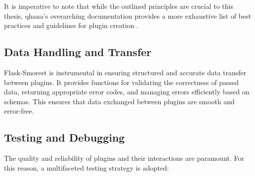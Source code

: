 \documentclass[
  a4paper,  %
  twoside,  %
  bibliography=totoc,
  headsepline,
  cleardoublepage=empty,
  parskip=half,
  draft=false
]{scrbook}
\begin{document}
It is imperative to note that while the outlined principles are crucial to this thesis, \gls{qhana}'s overarching documentation provides a more exhaustive list of best practices and guidelines for plugin creation \cite{FabianBuehler}.


\subsection{Data Handling and Transfer}
Flask-Smorest is instrumental in ensuring structured and accurate data transfer between plugins.
It provides functions for validating the correctness of passed data, returning appropriate error codes, and managing errors efficiently based on schemas.
This ensures that data exchanged between plugins are smooth and error-free.

\subsection{Testing and Debugging}

The quality and reliability of plugins and their interactions are paramount.
For this reason, a multifaceted testing strategy is adopted:
\end{document}
